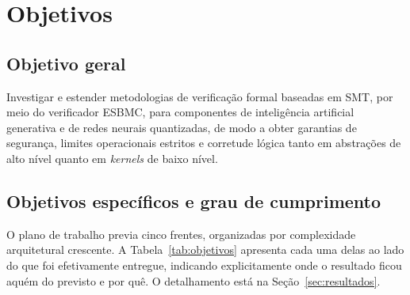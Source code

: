 \section{Objetivos}
\label{sec:objetivos}

\subsection{Objetivo geral}

Investigar e estender metodologias de verificação formal baseadas em SMT, por meio do
verificador ESBMC, para componentes de inteligência artificial generativa e de redes
neurais quantizadas, de modo a obter garantias de segurança, limites operacionais estritos
e corretude lógica tanto em abstrações de alto nível quanto em \textit{kernels} de baixo
nível.

\subsection{Objetivos específicos e grau de cumprimento}

O plano de trabalho previa cinco frentes, organizadas por complexidade arquitetural
crescente. A Tabela~\ref{tab:objetivos} apresenta cada uma delas ao lado do que foi
efetivamente entregue, indicando explicitamente onde o resultado ficou aquém do previsto e
por quê. O detalhamento está na Seção~\ref{sec:resultados}.

